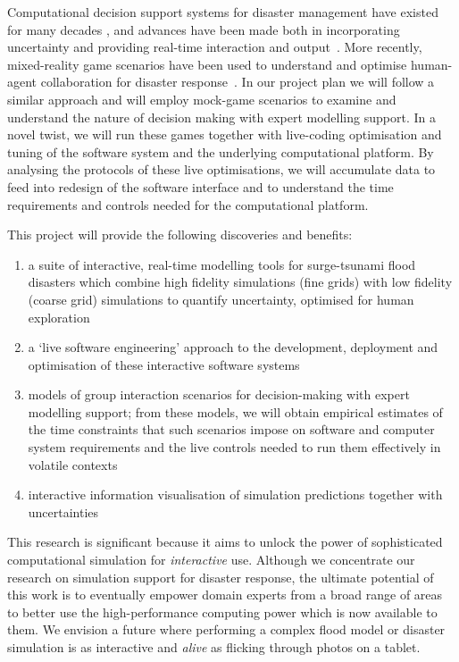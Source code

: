 Computational decision support systems for disaster management have
existed for many decades \parencite{wallaceDecision1985}, and
advances have been made both in incorporating
uncertainty \parencite{thompsonSocial2014,nealeNavigating2015}
and providing real-time interaction and
output~\parencite{yuSupport2006}. More recently, mixed-reality game
scenarios have been used to understand and optimise human-agent
collaboration for disaster response~\parencite{ramchurn2016human}. In
our project plan we will follow a similar approach and will employ
mock-game scenarios to examine and understand the nature of decision
making with expert modelling support. In a novel twist, we will run
these games together with live-coding optimisation and tuning of the
software system and the underlying computational platform. By
analysing the protocols of these live optimisations, we will
accumulate data to feed into redesign of the software interface and to
understand the time requirements and controls needed for the
computational platform.

\medskip
This project will provide the following discoveries and benefits:
\begin{enumerate}

\item a suite of interactive, real-time modelling tools for
  surge-tsunami flood disasters which combine high fidelity
  simulations (fine grids) with low fidelity (coarse grid) simulations
  to quantify uncertainty, optimised for human exploration

\item a `live software engineering' approach to the development,
  deployment and optimisation of these interactive software systems

\item models of group interaction scenarios for decision-making with
  expert modelling support; from these models, we will obtain  empirical estimates of
  the time constraints that such scenarios impose on software
  and computer system requirements and the live controls needed to run
  them effectively in volatile contexts

\item interactive information visualisation of simulation predictions
together with uncertainties
 

\end{enumerate}

This research is significant because it aims to unlock the power of
sophisticated computational simulation for \emph{interactive} use.
Although we concentrate our research on simulation support for
disaster response, the ultimate potential of this work is to
eventually empower domain experts from a broad range of areas to
better use the high-performance computing power which is now available
to them. We envision a future where performing a complex flood model
or disaster simulation is as interactive and \emph{alive} as flicking
through photos on a tablet.

